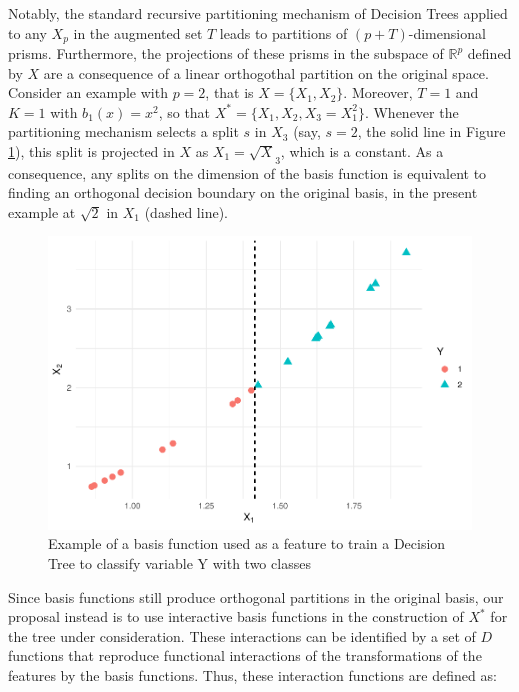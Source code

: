 \documentclass[]{elsarticle} %
\makeatletter
\def\maxwidth{\ifdim\Gin@nat@width>\linewidth\linewidth
\else\Gin@nat@width\fi}
\let\Oldincludegraphics\includegraphics
\renewcommand{\includegraphics}[1]{\Oldincludegraphics[width=\maxwidth]{#1}}
\makeatother
\begin{document}
Notably, the standard recursive partitioning mechanism of Decision Trees
applied to any \(X_p\) in the augmented set \(T\) leads to partitions of
\(\left(p+T\right)\)-dimensional prisms. Furthermore, the projections of
these prisms in the subspace of \(\mathbb{R}^{p}\) defined by \(X\) are
a consequence of a linear orthogothal partition on the original space.
Consider an example with \(p=2\), that is \(X=\{X_1,X_2\}\). Moreover,
\(T=1\) and \(K=1\) with \(b_1(x)=x^2\), so that
\(X^\ast=\{X_1,X_2,X_3=X_1^2\}\). Whenever the partitioning mechanism
selects a split \(s\) in \(X_3\) (say, \(s=2\), the solid line in Figure
\ref{fig:fig3-simple-basis}), this split is projected in \(X\) as
\(X_1=\sqrt X_3\), which is a constant. As a consequence, any splits on
the dimension of the basis function is equivalent to finding an
orthogonal decision boundary on the original basis, in the present
example at \(\sqrt 2\) in \(X_1\) (dashed line).

\begin{figure}[htbp]
\centering
\includegraphics{Trees_with_Base_Functions_v2_files/figure-latex/fig3-simple-basis-1.pdf}
\caption{\label{fig:fig3-simple-basis}Example of a basis function used
as a feature to train a Decision Tree to classify variable Y with two
classes}
\end{figure}

Since basis functions still produce orthogonal partitions in the
original basis, our proposal instead is to use interactive basis
functions in the construction of \(X^\ast\) for the tree under
consideration. These interactions can be identified by a set of \(D\)
functions that reproduce functional interactions of the transformations
of the features by the basis functions. Thus, these interaction
functions are defined as:
\end{document}

